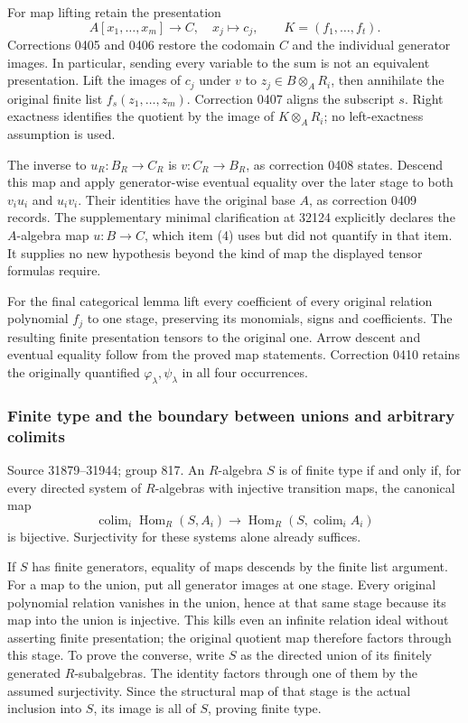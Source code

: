 For map lifting retain the presentation \[
A[x_1,\ldots,x_m]\longrightarrow C,\quad x_j\longmapsto c_j,
\qquad K=(f_1,\ldots,f_t).
\] Corrections 0405 and 0406 restore the codomain \(C\) and the individual generator images. In particular, sending every variable to the sum is not an equivalent presentation. Lift the images of \(c_j\) under \(v\) to \(z_j\in B\otimes_A R_i\), then annihilate the original finite list \(f_s(z_1,\ldots,z_m)\). Correction 0407 aligns the subscript \(s\). Right exactness identifies the quotient by the image of \(K\otimes_A R_i\); no left-exactness assumption is used.

The inverse to \(u_R:B_R\to C_R\) is \(v:C_R\to B_R\), as correction 0408 states. Descend this map and apply generator-wise eventual equality over the later stage to both \(v_i u_i\) and \(u_i v_i\). Their identities have the original base \(A\), as correction 0409 records. The supplementary minimal clarification at 32124 explicitly declares the \(A\)-algebra map \(u:B\to C\), which item (4) uses but did not quantify in that item. It supplies no new hypothesis beyond the kind of map the displayed tensor formulas require.

For the final categorical lemma lift every coefficient of every original relation polynomial \(f_j\) to one stage, preserving its monomials, signs and coefficients. The resulting finite presentation tensors to the original one. Arrow descent and eventual equality follow from the proved map statements. Correction 0410 retains the originally quantified \(\varphi_\lambda,\psi_\lambda\) in all four occurrences.

\subsubsection{Finite type and the boundary between unions and arbitrary colimits}\label{algebra-proof-036-finite-type-and-the-boundary-between-unions-and-arbitrary-colimits}

Source 31879--31944; group 817. An \(R\)-algebra \(S\) is of finite type if and only if, for every directed system of \(R\)-algebras with injective transition maps, the canonical map \[
\operatorname{colim}_i\operatorname{Hom}_R(S,A_i)
\longrightarrow\operatorname{Hom}_R(S,\operatorname{colim}_i A_i)
\] is bijective. Surjectivity for these systems alone already suffices.

If \(S\) has finite generators, equality of maps descends by the finite list argument. For a map to the union, put all generator images at one stage. Every original polynomial relation vanishes in the union, hence at that same stage because its map into the union is injective. This kills even an infinite relation ideal without asserting finite presentation; the original quotient map therefore factors through this stage. To prove the converse, write \(S\) as the directed union of its finitely generated \(R\)-subalgebras. The identity factors through one of them by the assumed surjectivity. Since the structural map of that stage is the actual inclusion into \(S\), its image is all of \(S\), proving finite type.

